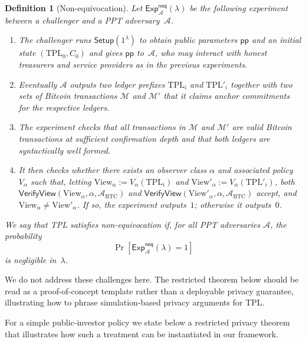 \documentclass[11pt]{article}
\newtheorem{definition}{Definition}
\begin{document}
\begin{definition}[Non-equivocation]
\label{def:non-equivocation}
Let $\mathsf{Exp}^{\mathsf{neq}}_{\mathcal{A}}(\lambda)$ be the following
experiment between a challenger and a PPT adversary~$\mathcal{A}$.
\begin{enumerate}[noitemsep]
  \item The challenger runs $\mathsf{Setup}(1^\lambda)$ to obtain public parameters
        $\mathsf{pp}$ and an initial state $(\mathrm{TPL}_0,C_0)$ and gives
        $\mathsf{pp}$ to~$\mathcal{A}$, who may interact with honest treasurers
        and service providers as in the previous experiments.
  \item Eventually $\mathcal{A}$ outputs two ledger prefixes
        $\mathrm{TPL}_i$ and $\mathrm{TPL}'_i$ together with two sets of Bitcoin
        transactions $\mathcal{M}$ and $\mathcal{M}'$ that it claims anchor
        commitments for the respective ledgers.
  \item The experiment checks that all transactions in $\mathcal{M}$ and
        $\mathcal{M}'$ are valid Bitcoin transactions at sufficient confirmation
        depth and that both ledgers are syntactically well formed.
  \item It then checks whether there exists an observer class $\alpha$ and
        associated policy $V_\alpha$ such that, letting
        $\mathrm{View}_\alpha := V_\alpha(\mathrm{TPL}_i)$ and
        $\mathrm{View}'_\alpha := V_\alpha(\mathrm{TPL}'_i)$,
        both $\mathsf{VerifyView}(\mathrm{View}_\alpha,\alpha,\mathcal{A}_{\mathrm{BTC}})$
        and $\mathsf{VerifyView}(\mathrm{View}'_\alpha,\alpha,\mathcal{A}_{\mathrm{BTC}})$
        accept, and $\mathrm{View}_\alpha \neq \mathrm{View}'_\alpha$.
        If so, the experiment outputs~$1$; otherwise it outputs~$0$.
\end{enumerate}
We say that TPL satisfies \emph{non-equivocation} if, for all PPT adversaries
$\mathcal{A}$, the probability
\[
  \Pr[\mathsf{Exp}^{\mathsf{neq}}_{\mathcal{A}}(\lambda)=1]
\]
is negligible in~$\lambda$.
\end{definition}
We do not address these challenges here. The restricted theorem below should be read as a proof-of-concept template rather than a deployable privacy guarantee, illustrating how to
phrase simulation-based privacy arguments for TPL.

For a simple public-investor policy we
state below a restricted privacy theorem that illustrates how such a treatment can be instantiated in our framework.
\end{document}

